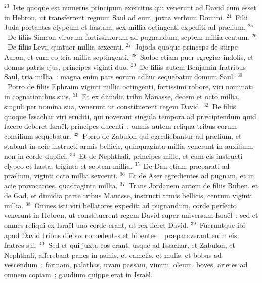${}^{23}$~Iste quoque est numerus principum exercitus qui venerunt ad David cum esset in Hebron, ut transferrent regnum Saul ad eum, juxta verbum Domini.
${}^{24}$~Filii Juda portantes clypeum et hastam, sex millia octingenti expediti ad pr\ae lium.
${}^{25}$~De filiis Simeon virorum fortissimorum ad pugnandum, septem millia centum.
${}^{26}$~De filiis Levi, quatuor millia sexcenti.
${}^{27}$~Jojoda quoque princeps de stirpe Aaron, et cum eo tria millia septingenti.
${}^{28}$~Sadoc etiam puer egregi\ae\ indolis, et domus patris ejus, principes viginti duo.
${}^{29}$~De filiis autem Benjamin fratribus Saul, tria millia~: magna enim pars eorum adhuc sequebatur domum Saul.
${}^{30}$~Porro de filiis Ephraim viginti millia octingenti, fortissimi robore, viri nominati in cognationibus suis.
${}^{31}$~Et ex dimidia tribu Manasse, decem et octo millia, singuli per nomina sua, venerunt ut constituerent regem David.
${}^{32}$~De filiis quoque Issachar viri eruditi, qui noverant singula tempora ad pr\ae cipiendum quid facere deberet Isra\"el, principes ducenti~: omnis autem reliqua tribus eorum consilium sequebatur.
${}^{33}$~Porro de Zabulon qui egrediebantur ad pr\ae lium, et stabant in acie instructi armis bellicis, quinquaginta millia venerunt in auxilium, non in corde duplici.
${}^{34}$~Et de Nephthali, principes mille, et cum eis instructi clypeo et hasta, triginta et septem millia.
${}^{35}$~De Dan etiam pr\ae parati ad pr\ae lium, viginti octo millia sexcenti.
${}^{36}$~Et de Aser egredientes ad pugnam, et in acie provocantes, quadraginta millia.
${}^{37}$~Trans Jordanem autem de filiis Ruben, et de Gad, et dimidia parte tribus Manasse, instructi armis bellicis, centum viginti millia.
${}^{38}$~Omnes isti viri bellatores expediti ad pugnandum, corde perfecto venerunt in Hebron, ut constituerent regem David super universum Isra\"el~: sed et omnes reliqui ex Isra\"el uno corde erant, ut rex fieret David.
${}^{39}$~Fueruntque ibi apud David tribus diebus comedentes et bibentes~: pr\ae paraverant enim eis fratres sui.
${}^{40}$~Sed et qui juxta eos erant, usque ad Issachar, et Zabulon, et Nephthali, afferebant panes in asinis, et camelis, et mulis, et bobus ad vescendum~: farinam, palathas, uvam passam, vinum, oleum, boves, arietes ad omnem copiam~: gaudium quippe erat in Isra\"el.

